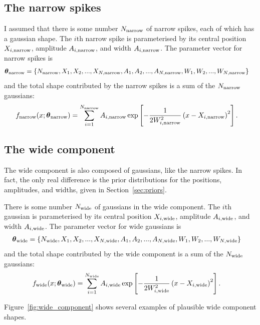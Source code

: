 \documentclass[a4paper, 12pt]{article}
\newcommand{\params}{\boldsymbol{\theta}}
\newcommand{\x}{x}
\begin{document}
\subsection{The narrow spikes}
I assumed that there is some number $N_{\rm narrow}$ of narrow spikes,
each of which has a gaussian shape. The $i$th narrow spike is parameterised
by its central position $X_{i, \rm narrow}$,
amplitude $A_{i, \rm narrow}$, and width $A_{i, \rm narrow}$.
The parameter vector for narrow spikes is
\begin{align}
\params_{\rm narrow} &=
  \{N_{\rm narrow}, X_1, X_2, ..., X_{N, \rm narrow},
    A_1, A_2, ..., A_{N, \rm narrow},
    W_1, W_2, ..., W_{N, \rm narrow}\}
\end{align}
and the total shape contributed by the
narrow spikes is a sum of the $N_{\rm narrow}$ gaussians:
\begin{align}
f_{\rm narrow}(\x; \params_{\rm narrow}) &=
    \sum_{i=1}^{N_{\rm narrow}} A_{i, \rm narrow}
 \exp\left[-\frac{1}{2W_{i, \rm narrow}^2}\left(x - X_{i, \rm narrow}\right)^2\right].
\end{align}

\subsection{The wide component}
The wide component is also composed of gaussians, like the narrow spikes.
In fact, the only real difference is the prior distributions for the positions,
amplitudes, and widths, given in Section~\ref{sec:priors}.

There is some number $N_{\rm wide}$ of gaussians in the wide component.
The $i$th gaussian is parameterised
by its central position $X_{i, \rm wide}$,
amplitude $A_{i, \rm wide}$, and width $A_{i, \rm wide}$.
The parameter vector for wide gaussians is
\begin{align}
\params_{\rm wide} &=
  \{N_{\rm wide}, X_1, X_2, ..., X_{N, \rm wide},
    A_1, A_2, ..., A_{N, \rm wide},
    W_1, W_2, ..., W_{N, \rm wide}\}
\end{align}
and the total shape contributed by the
wide component is a sum of the $N_{\rm wide}$ gaussians:
\begin{align}
f_{\rm wide}(\x; \params_{\rm wide}) &=
    \sum_{i=1}^{N_{\rm wide}} A_{i, \rm wide}
 \exp\left[-\frac{1}{2W_{i, \rm wide}^2}\left(x - X_{i, \rm wide}\right)^2\right].
\end{align}

Figure~\ref{fig:wide_component} shows several examples of plausible
wide component shapes.
\end{document}
